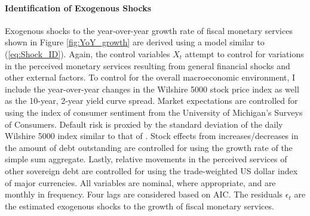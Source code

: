 \documentclass[11pt,a4paper,margin=1.5in]{article}
\begin{document}
\paragraph{Identification of Exogenous Shocks}
Exogenous shocks to the year-over-year growth rate of fiscal monetary services shown in Figure \ref{fig:YoY_growth} are derived using a model similar to (\ref{eq:Shock_ID}).
Again, the control variables $X_t$ attempt to control for variations in the perceived monetary services resulting from general financial shocks and other external factors.
To control for the overall macroeconomic environment, I include the year-over-year changes in the Wilshire 5000 stock price index as well as the 10-year, 2-year yield curve spread.
Market expectations are controlled for using the index of consumer sentiment from the University of Michigan's Surveys of Consumers.
Default risk is proxied by the standard deviation of the daily Wilshire 5000 index similar to that of \citet{Krishnamurthy-VissingJorgensen:2012}.
Stock effects from increases/decreases in the amount of debt outstanding are controlled for using the growth rate of the simple sum aggregate.
Lastly, relative movements in the perceived services of other sovereign debt are controlled for using the trade-weighted US dollar index of major currencies.
All variables are nominal, where appropriate, and are monthly in frequency.
Four lags are considered based on AIC.
The residuals $\epsilon_t$ are the estimated exogenous shocks to the growth of fiscal monetary services.
\end{document}
